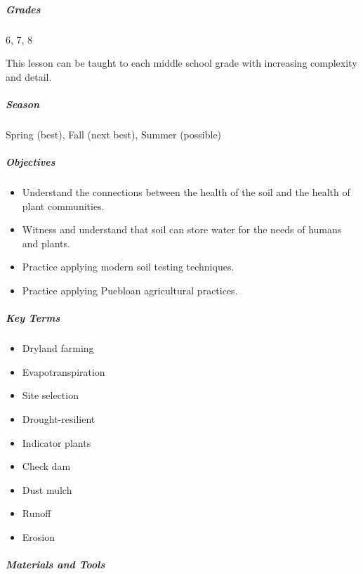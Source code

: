 \documentclass[12pt,]{article}
\providecommand{\tightlist}{%
  \setlength{\itemsep}{0pt}\setlength{\parskip}{0pt}}
\let\oldsubparagraph\subparagraph
\renewcommand{\subparagraph}[1]{\oldsubparagraph{#1}\mbox{}}
\begin{document}
\hypertarget{grades}{%
\subparagraph{Grades}\label{grades}}

6, 7, 8

This lesson can be taught to each middle school grade with increasing
complexity and detail.

\hypertarget{season}{%
\subparagraph{Season}\label{season}}

Spring (best), Fall (next best), Summer (possible)

\hypertarget{objectives}{%
\subparagraph{Objectives}\label{objectives}}

\begin{itemize}
\tightlist
\item
  Understand the connections between the health of the soil and the health of plant communities.
\item
  Witness and understand that soil can store water for the needs of humans and plants.
\item
  Practice applying modern soil testing techniques.
\item
  Practice applying Puebloan agricultural practices.
\end{itemize}

\hypertarget{key-terms}{%
\subparagraph{Key Terms}\label{key-terms}}

\begin{itemize}
\tightlist
\item
  Dryland farming
\item
  Evapotranspiration
\item
  Site selection
\item
  Drought-resilient
\item
  Indicator plants
\item
  Check dam
\item
  Dust mulch
\item
  Runoff
\item
  Erosion
\end{itemize}

\hypertarget{materials-and-tools}{%
\subparagraph{Materials and Tools}\label{materials-and-tools}}
\end{document}
